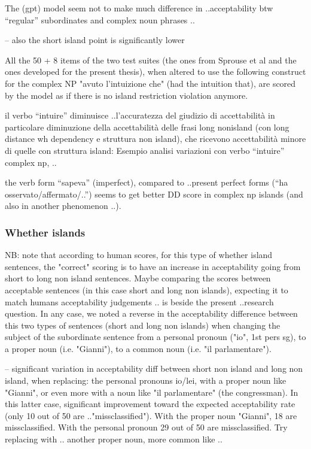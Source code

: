 The (gpt) model seem not to make much difference in ..acceptability btw “regular” subordinates and complex noun phrases ..

-- also the short island point is significantly lower

All the 50 + 8 items of the two test suites (the ones from Sprouse et al and the ones developed for the present thesis), when altered to use the following construct for the complex NP "avuto l'intuizione che" (had the intuition that), are scored by the model as if there is no island restriction violation anymore. 

il verbo “intuire” diminuisce ..l’accuratezza del giudizio di accettabilità
in particolare diminuzione della accettabilità delle frasi long nonisland (con long distance wh dependency e struttura non island), che ricevono accettabilità minore di quelle con struttura island:
Esempio analisi variazioni con verbo “intuire” complex np, ..

the verb form “sapeva” (imperfect), compared to ..present perfect forms (“ha osservato/affermato/..”) seems to get better DD score in complex np islands (and also in another phenomenon ..).

\subsubsection{Whether islands}
NB: note that according to human scores, for this type of whether island sentences, the "correct" scoring is to have an increase in acceptability going from short to long non island sentences.
Maybe comparing the scores between acceptable sentences (in this case short and long non islands), expecting it to match humans acceptability judgements .. is beside the present ..research question.
In any case, we noted a reverse in the acceptability difference between this two types of sentences (short and long non islands) when changing the subject of the subordinate sentence from a personal pronoun ("io", 1st pers sg), to a proper noun (i.e. "Gianni"), to a common noun (i.e. "il parlamentare").

-- significant variation in acceptability diff between short non island and long non island, when replacing: the personal pronouns io/lei, with a proper noun like "Gianni", or even more with a noun like "il parlamentare" (the congressman). In this latter case, significant improvement toward the expected acceptability rate (only 10 out of 50 are .."missclassified"). With the proper noun "Gianni", 18 are missclassified. With the personal pronoun 29 out of 50 are missclassified.
Try replacing with .. another proper noun, more common like ..


